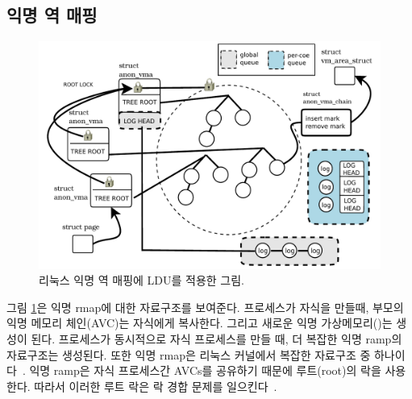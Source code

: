 \subsection{익명 역 매핑}

\begin{figure}[tb]
  \begin{center}
     \includegraphics[width=1\textwidth,height=1\textheight,keepaspectratio]{fig/anon_vma}
  \end{center}
  \caption{리눅스 익명 역 매핑에 LDU를 적용한 그림.}
  \label{fig:anonvmaramp}
\end{figure}

그림 \ref{fig:anonvmaramp}은 익명 rmap에 대한 자료구조를 보여준다.
프로세스가 자식을 만들때, 부모의 익명 메모리 체인(AVC)는 자식에게 복사한다. 
그리고 새로운 익명 가상메모리()는 생성이 된다.
프로세스가 동시적으로 자식 프로세스를 만들 때, 더 복잡한 익명 ramp의 자료구조는 생성된다.
또한 익명 rmap은 리눅스 커널에서 복잡한 자료구조 중 하나이다~\cite{CorbetLWNANON}.
익명 ramp은 자식 프로세스간 AVCs를 공유하기 때문에 루트(root)의 락을 사용한다.
따라서 이러한 루트 락은 락 경합 문제를 일으킨다~\cite{Andi2011adding}.  



